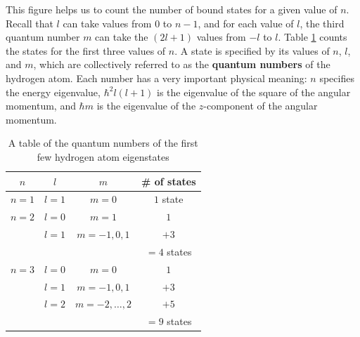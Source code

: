 This figure helps us to count the number of bound states for a given value of $n$. Recall that $l$ can take values from $0$ to $n-1$, and for each value of $l$, the third quantum number $m$ can take the $(2l+1)$ values from $-l$ to $l$. Table \ref{hydrogen_spectrum} counts the states for the first three values of $n$. A state is specified by its values of $n$, $l$, and $m$, which are collectively referred to as the \textbf{quantum numbers} of the hydrogen atom. Each number has a very important physical meaning: $n$ specifies the energy eigenvalue, $\hbar^2 l(l+1)$ is the eigenvalue of the square of the angular momentum, and $\hbar m$ is the eigenvalue of the $z$-component of the angular momentum.

\begin{table}[]
    \centering
    \begin{tabular}{|c|c|c|c|}
    \hline
        $n$ & $l$ & $m$ & \# of states \\
        \hline
        $n=1$ & $l=1$ & $m=0$ & $1$ state \\
        \hline
        $n=2$ & $l=0$ & $m=1 $& $1$ \\
        & $l=1$ & $m=-1,0,1$ & $+3$ \\ 
        & & & $=4$ states \\
        \hline
        $n=3$ & $l=0$ & $m=0$ & $1$\\
        & $l=1$ & $m=-1,0,1$ & $+3$ \\
        & $l=2$ & $m=-2,\ldots,2$ & $+5$ \\
        & & & $=9$ states \\
    \hline
    \end{tabular}
    \caption{A table of the quantum numbers of the first few hydrogen atom eigenstates}
    \label{hydrogen_spectrum}
\end{table}

